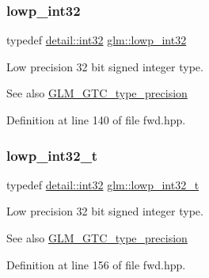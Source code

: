 \subsubsection{\texorpdfstring{lowp\+\_\+int32}{lowp\_int32}}
{\footnotesize\ttfamily typedef \hyperlink{namespaceglm_1_1detail_a9f85b4efeca416cdcec2fd08939a2e17}{detail\+::int32} \hyperlink{group__gtc__type__precision_gad9939c9d6fec1c6accc02a83c6500f08}{glm\+::lowp\+\_\+int32}}

Low precision 32 bit signed integer type. \begin{DoxySeeAlso}{See also}
\hyperlink{group__gtc__type__precision}{G\+L\+M\+\_\+\+G\+T\+C\+\_\+type\+\_\+precision} 
\end{DoxySeeAlso}


Definition at line 140 of file fwd.\+hpp.

\mbox{\label{group__gtc__type__precision_gad9567c806dc39f534174eef42663119d}} 
\subsubsection{\texorpdfstring{lowp\+\_\+int32\+\_\+t}{lowp\_int32\_t}}
{\footnotesize\ttfamily typedef \hyperlink{namespaceglm_1_1detail_a9f85b4efeca416cdcec2fd08939a2e17}{detail\+::int32} \hyperlink{group__gtc__type__precision_gad9567c806dc39f534174eef42663119d}{glm\+::lowp\+\_\+int32\+\_\+t}}

Low precision 32 bit signed integer type. \begin{DoxySeeAlso}{See also}
\hyperlink{group__gtc__type__precision}{G\+L\+M\+\_\+\+G\+T\+C\+\_\+type\+\_\+precision} 
\end{DoxySeeAlso}


Definition at line 156 of file fwd.\+hpp.

\mbox{\label{group__gtc__type__precision_gab8a8e75af347592406e41b3ae2c0712b}} 
